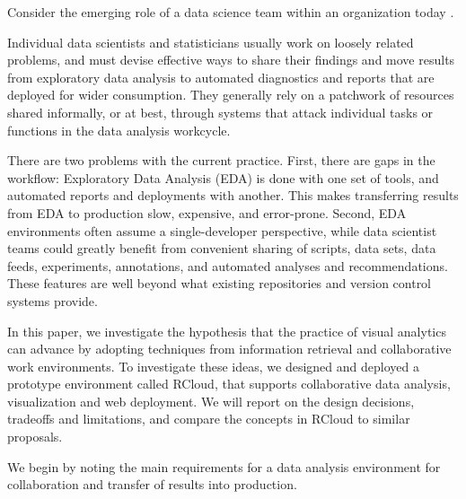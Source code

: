 

\maketitle


Consider the emerging role of a data science team within an
organization today \cite{Keim:2008:VAS}.

Individual data scientists and statisticians usually work on loosely
related problems, and must devise effective ways to share their findings
and move results from exploratory data analysis to automated diagnostics
and reports that are deployed for wider consumption.
They generally rely on a patchwork of resources shared informally,
or at best, through systems that attack individual tasks or functions
in the data analysis workcycle. %

There are two problems with the current
practice. First, there are gaps in the workflow:
Exploratory Data Analysis (EDA) is done with one set of tools,
and automated reports and deployments with another. This makes
transferring results from EDA to production slow, expensive, and error-prone.
Second, EDA environments often assume a single-developer perspective,
while data scientist teams could greatly benefit from convenient sharing of
scripts, data sets, data feeds, experiments, annotations, and automated
analyses and recommendations. These features are well beyond what existing
repositories and version control systems provide.

 In this paper, we investigate the hypothesis
that the practice of visual analytics can advance by adopting techniques
from information retrieval and collaborative work environments. To investigate
these ideas, we designed and deployed a prototype environment called RCloud,
that supports collaborative data analysis, visualization and web deployment.
We will report on the design decisions, tradeoffs and limitations, and compare
the concepts in RCloud to similar proposals.


We begin by noting the main requirements for a data analysis environment for
collaboration and transfer of results into production.

